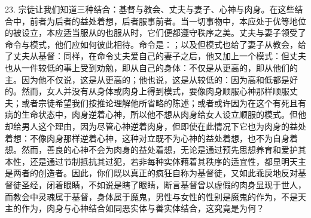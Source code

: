 23. 宗徒让我们知道三种结合：基督与教会、丈夫与妻子、心神与肉身。在这些结合中，前者为后者的益处着想，后者服事前者。当一切事物中，本应处于优等地位的被设立，本应适当服从的也服从时，它们便都遵守秩序之美。丈夫与妻子领受了命令与模式，他们应如何彼此相待。命令是：；以及但模式也给了妻子从教会，给了丈夫从基督：同样，在命令丈夫爱自己的妻子之后，他又加上一个模式：但丈夫也从一件较低的事上受到劝勉，即从自己的身体：不仅是从更高的，即从他们的主。因为他不仅说，这是从更高的；他也说，这是从较低的：因为高和低都是好的。然而，女人并没有从身体或肉身上得到模式，要像肉身顺服心神那样顺服丈夫；或者宗徒希望我们按推论理解他所省略的陈述；或者或许因为在这个有死且有病的生命状态中，肉身逆着心神，所以他不想从肉身给女人设立顺服的模式。但他却给男人这个理由，因为尽管心神逆着肉身，但即使在此情况下它也为肉身的益处着想：不像肉身那样逆着心神，这种对立既不为心神的益处着想，也不为自身着想。然而，善良的心神不会为肉身的益处着想，无论是通过预先思想养育和爱护其本性，还是通过节制抵抗其过犯，若非每种实体藉着其秩序的适宜性，都显明天主是两者的创造者。因此，你们既以真正的疯狂自称为基督徒，又如此乖戾地反对基督徒圣经，闭着眼睛，不如说是瞎了眼睛，断言基督曾以虚假的肉身显现于世人，而教会中灵魂属于基督，身体属于魔鬼，男性与女性的性别是魔鬼的作为，不是天主的作为，肉身与心神结合如同恶实体与善实体结合，这究竟是为何？\par


